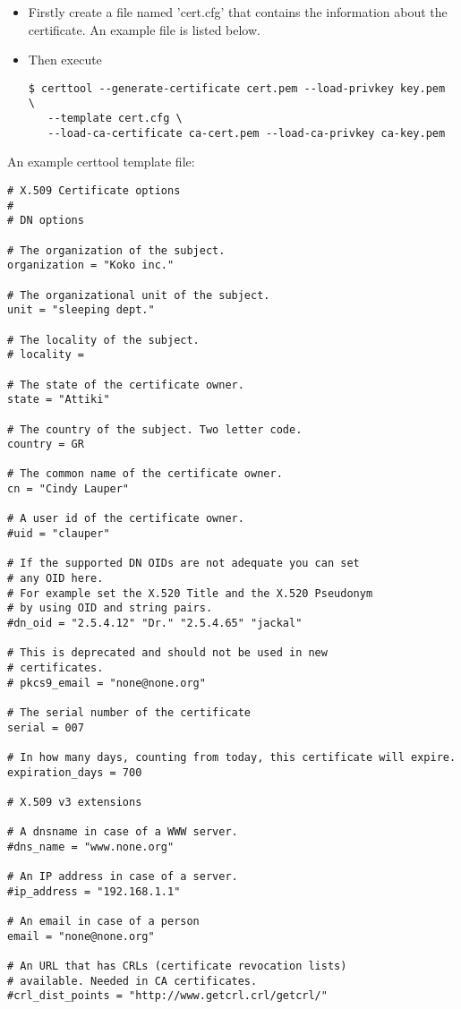 \begin{itemize}
\item Firstly create a file named 'cert.cfg' that contains the information
about the certificate. An example file is listed below.
\item Then execute
\begin{verbatim}
$ certtool --generate-certificate cert.pem --load-privkey key.pem  \
   --template cert.cfg \
   --load-ca-certificate ca-cert.pem --load-ca-privkey ca-key.pem
\end{verbatim}
\end{itemize}
\par
An example certtool template file:

\begin{verbatim}
# X.509 Certificate options
#
# DN options

# The organization of the subject.
organization = "Koko inc."

# The organizational unit of the subject.
unit = "sleeping dept."

# The locality of the subject.
# locality = 

# The state of the certificate owner.
state = "Attiki"

# The country of the subject. Two letter code.
country = GR

# The common name of the certificate owner.
cn = "Cindy Lauper"

# A user id of the certificate owner.
#uid = "clauper"

# If the supported DN OIDs are not adequate you can set
# any OID here.
# For example set the X.520 Title and the X.520 Pseudonym
# by using OID and string pairs.
#dn_oid = "2.5.4.12" "Dr." "2.5.4.65" "jackal" 

# This is deprecated and should not be used in new
# certificates.
# pkcs9_email = "none@none.org"

# The serial number of the certificate
serial = 007

# In how many days, counting from today, this certificate will expire.
expiration_days = 700

# X.509 v3 extensions

# A dnsname in case of a WWW server.
#dns_name = "www.none.org"

# An IP address in case of a server.
#ip_address = "192.168.1.1"

# An email in case of a person
email = "none@none.org"

# An URL that has CRLs (certificate revocation lists)
# available. Needed in CA certificates.
#crl_dist_points = "http://www.getcrl.crl/getcrl/"


\end{verbatim}
